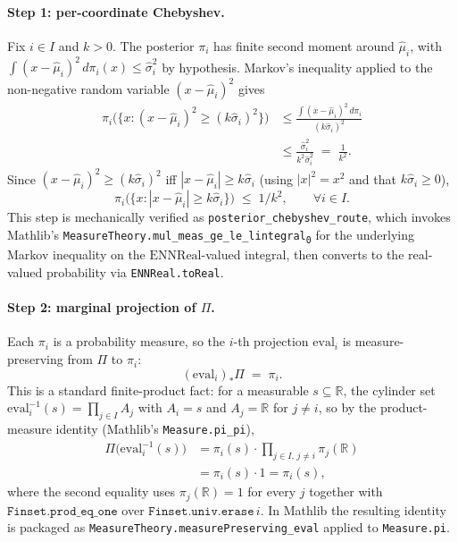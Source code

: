 \documentclass[11pt]{article}
\theoremstyle{definition}
\theoremstyle{remark}
\begin{document}
\paragraph{Step 1: per-coordinate Chebyshev.}
Fix $i \in I$ and $k > 0$. The posterior $\pi_i$ has finite second
moment around $\hat\mu_i$, with $\int (x - \hat\mu_i)^2\,d\pi_i(x)
\leq \hat\sigma_i^2$ by hypothesis. Markov's inequality applied to
the non-negative random variable $(x - \hat\mu_i)^2$ gives
\begin{align*}
\pi_i\bigl(\{x : (x - \hat\mu_i)^2 \geq (k\hat\sigma_i)^2\}\bigr)
  &\leq \frac{\int (x - \hat\mu_i)^2 \, d\pi_i}{(k\hat\sigma_i)^2} \\
  &\leq \frac{\hat\sigma_i^2}{k^2 \hat\sigma_i^2}
  \;=\; \frac{1}{k^2}.
\end{align*}
Since $(x - \hat\mu_i)^2 \geq (k\hat\sigma_i)^2$ iff
$|x - \hat\mu_i| \geq k\hat\sigma_i$ (using
$|x|^2 = x^2$ and that $k\hat\sigma_i \geq 0$),
\begin{equation}
\pi_i\bigl(\{x : |x - \hat\mu_i| \geq k\hat\sigma_i\}\bigr)
\;\leq\; 1/k^2,\qquad \forall i \in I.
\label{eq:per_coord_chebyshev}
\end{equation}
This step is mechanically verified as
\texttt{posterior\_chebyshev\_route}, which invokes Mathlib's
\texttt{MeasureTheory.\allowbreak mul\_meas\_ge\_le\_lintegral\textsubscript{0}} for the
underlying Markov inequality on the $\mathrm{ENNReal}$-valued
integral, then converts to the real-valued probability via
\texttt{ENNReal.toReal}.

\paragraph{Step 2: marginal projection of $\Pi$.}
Each $\pi_i$ is a probability measure, so the $i$-th projection
$\mathrm{eval}_i$ is measure-preserving from $\Pi$ to $\pi_i$:
\begin{equation}
(\mathrm{eval}_i)_*\Pi \;=\; \pi_i.
\label{eq:eval_meas_preserving}
\end{equation}
This is a standard finite-product fact: for a measurable
$s \subseteq \mathbb{R}$, the cylinder set
$\mathrm{eval}_i^{-1}(s) = \prod_{j \in I} A_j$ with $A_i = s$ and
$A_j = \mathbb{R}$ for $j \neq i$, so by the product-measure
identity (Mathlib's \texttt{Measure.pi\_pi}),
\begin{align*}
\Pi\bigl(\mathrm{eval}_i^{-1}(s)\bigr)
  &= \pi_i(s) \cdot \!\prod_{j \in I,\, j \neq i}\! \pi_j(\mathbb{R}) \\
  &= \pi_i(s) \cdot 1 = \pi_i(s),
\end{align*}
where the second equality uses $\pi_j(\mathbb{R}) = 1$ for every
$j$ together with $\mathtt{Finset.prod\_eq\_one}$ over
$\mathtt{Finset.univ.erase}\,i$. In Mathlib the resulting
identity is packaged as
\texttt{MeasureTheory.measurePreserving\_eval} applied to
\texttt{Measure.pi}.
\end{document}
